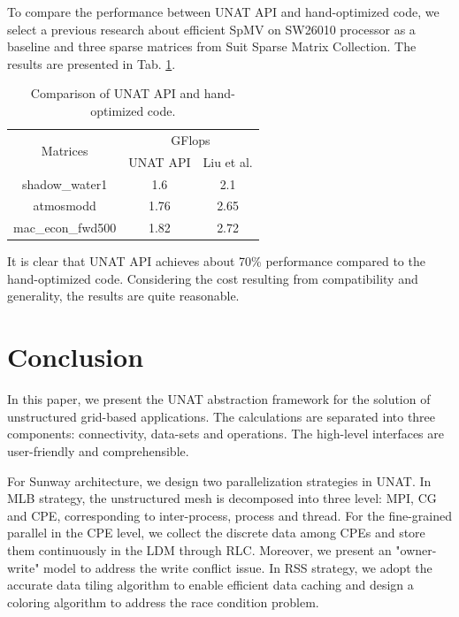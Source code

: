 \documentclass[5p,times]{elsarticle}
\begin{document}
To compare the performance between UNAT API and hand-optimized code, we select a previous research about efficient SpMV on SW26010 processor as a baseline and three sparse matrices from Suit Sparse Matrix Collection. The results are presented in Tab. \ref{comparision}.
\begin{table}[]
\centering
\caption{Comparison of UNAT API and hand-optimized code.}
\begin{tabular}{|c|c|c|}
\hline
\multirow{2}{*}{Matrices} & \multicolumn{2}{c|}{GFlops} \\ \cline{2-3} 
                          & UNAT API        & Liu et al.\cite{b8}       \\ \hline
shadow\_water1            & 1.6             & 2.1       \\ \hline
atmosmodd                 & 1.76            & 2.65      \\ \hline
mac\_econ\_fwd500         & 1.82            & 2.72      \\ \hline
\end{tabular}
\label{comparision}
\end{table}
It is clear that UNAT API achieves about 70\% performance compared to the hand-optimized code. Considering the cost resulting from compatibility and generality, the results are quite reasonable.

\section{Conclusion}

In this paper, we present the UNAT abstraction framework for the solution of unstructured grid-based applications. The calculations are separated into three components: connectivity, data-sets and operations. The high-level interfaces are user-friendly and comprehensible.

For Sunway architecture, we design two parallelization strategies in UNAT. In MLB strategy, the unstructured mesh is decomposed into three level: MPI, CG and CPE, corresponding to inter-process, process and thread. For the fine-grained parallel in the CPE level, we collect the discrete data among CPEs and store them continuously in the LDM through RLC. Moreover, we present an "owner-write" model to address the write conflict issue. In RSS strategy, we adopt the accurate data tiling algorithm to enable efficient data caching and design a coloring algorithm to address the race condition problem.
\end{document}
